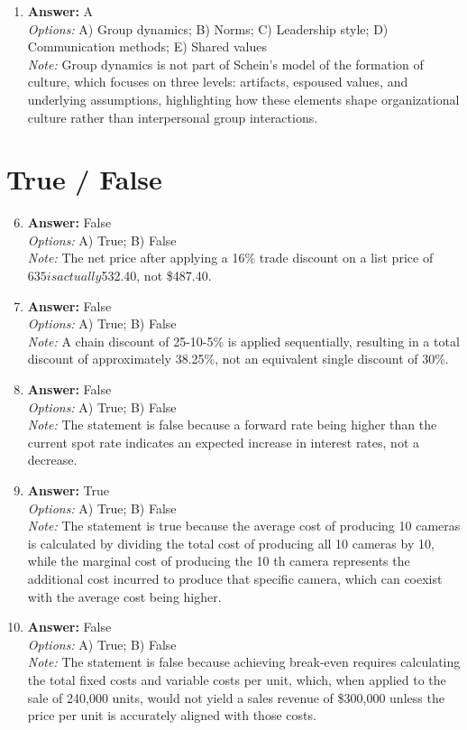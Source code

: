 \documentclass[12pt]{article}
\begin{document}
\begin{enumerate}[label=\arabic*.]
\item \textbf{Answer:} A
\\ \textit{Options:} A) Group dynamics; B) Norms; C) Leadership style; D) Communication methods; E) Shared values
\\ \textit{Note:} Group dynamics is not part of Schein's model of the formation of culture, which focuses on three levels: artifacts, espoused values, and underlying assumptions, highlighting how these elements shape organizational culture rather than interpersonal group interactions.
\end{enumerate}

\section*{True / False}
\begin{enumerate}[label=\arabic*.]
\setcounter{enumi}{5}
\item \textbf{Answer:} False
\\ \textit{Options:} A) True; B) False
\\ \textit{Note:} The net price after applying a 16\% trade discount on a list price of $635 is actually $532.40, not \$487.40.
\item \textbf{Answer:} False
\\ \textit{Options:} A) True; B) False
\\ \textit{Note:} A chain discount of 25-10-5\% is applied sequentially, resulting in a total discount of approximately 38.25\%, not an equivalent single discount of 30\%.
\item \textbf{Answer:} False
\\ \textit{Options:} A) True; B) False
\\ \textit{Note:} The statement is false because a forward rate being higher than the current spot rate indicates an expected increase in interest rates, not a decrease.
\item \textbf{Answer:} True
\\ \textit{Options:} A) True; B) False
\\ \textit{Note:} The statement is true because the average cost of producing 10 cameras is calculated by dividing the total cost of producing all 10 cameras by 10, while the marginal cost of producing the 10 th camera represents the additional cost incurred to produce that specific camera, which can coexist with the average cost being higher.
\item \textbf{Answer:} False
\\ \textit{Options:} A) True; B) False
\\ \textit{Note:} The statement is false because achieving break-even requires calculating the total fixed costs and variable costs per unit, which, when applied to the sale of 240,000 units, would not yield a sales revenue of \$300,000 unless the price per unit is accurately aligned with those costs.
\end{enumerate}
\end{document}
